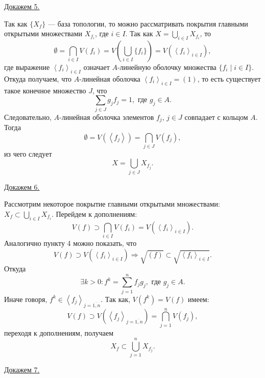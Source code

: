     \underline{Докажем 5.}
    \begin{Proof}
        Так как $\{X_f\}$ --- база топологии, то можно рассматривать покрытия главными открытыми множествами $X_{f_i}$, где $i \in I$. Так как $X = \bigcup_{i \in I} X_{f_i}$, то
        $$
            \emptyset = \bigcap_{i \in I} V(f_i) = V\left(\bigcup_{i \in I}\{f_i\}\right) = V(\left<f_i \right>_{i \in I}),
        $$
        где выражение $\left<f_i \right>_{i \in I}$ означает $A$-линейную оболочку множества $\{f_i \mid i \in I\}$.
        Откуда получаем, что $A$-линейная оболочка $\left<f_i \right>_{i \in I} = (1)$, то есть существует такое конечное множество $J$, что 
        $$
            \sum_{j \in J} g_jf_j = 1, \text{ где $g_j \in A$.}
        $$ 
        Следовательно, $A$-линейная оболочка элементов $f_j$, $j \in J$ совпадает с кольцом $A$. Тогда
        $$
            \emptyset = V(\left<f_j\right>) = \bigcap_{j \in J} V(f_j),
        $$
        из чего следует
        $$
            X = \bigcup_{j \in J} X_{f_j}.
        $$
    \end{Proof}
    \underline{Докажем 6.}
    \begin{Proof}
        
        Рассмотрим некоторое покрытие главными открытыми множествами: $X_f \subset \bigcup_{i \in I} X_{f_i}$. Перейдем к дополнениям:
        $$
            V(f) \supset \bigcap_{i \in I} V(f_i) = V(\left<f_i\right>_{i \in I}).
        $$
        Аналогично пункту 4 можно показать, что 
        $$
            V(f) \supset V(\left<f_i\right>_{i \in I}) \Rightarrow \sqrt{(f)} \subset \sqrt{\left<f_i\right>_{i \in I}}.
        $$
        Откуда 
        $$
            \exists k > 0 : f^k = \sum_{j = 1}^n f_jg_j, \text{ где $g_j \in A$.}
        $$
        Иначе говоря, $f^k \in \left<f_j\right>_{j = \overline{1, n}}$. Так как, $V(f^k) = V(f)$ имеем:
        $$
            V(f) \supset V(\left<f_j\right>_{j = \overline{1, n}}) = \bigcap_{j = 1}^n V(f_j),
        $$
        переходя к дополнениям, получаем 
        $$
            X_f \subset \bigcup_{j = 1}^n X_{f_j}.
        $$
    \end{Proof}
    \underline{Докажем 7.}
